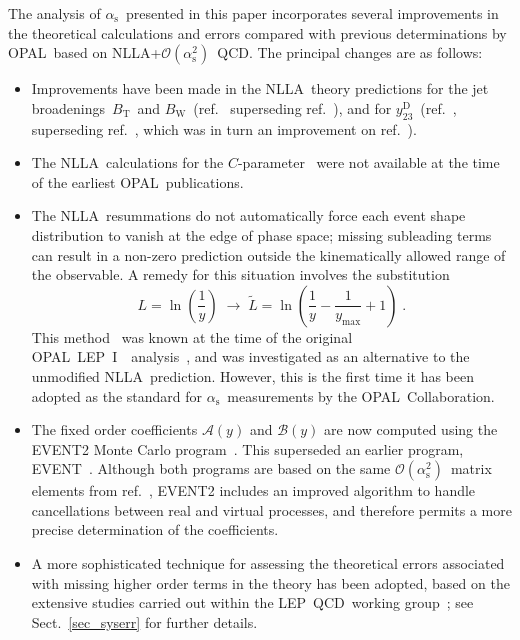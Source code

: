 \documentclass[12pt,a4paper,twoside]{article}
\newcommand{\as}     {\ensuremath{\alpha_{\mathrm{s}}}}
\newcommand{\oaa}    {\ensuremath{\mathcal{O}(\alpha_{\mathrm{s}}^2)}}
\newcommand{\bt}     {\ensuremath{B_{\mathrm{T}}}}
\newcommand{\bw}     {\ensuremath{B_{\mathrm{W}}}}
\newcommand{\ytwothree}   {\ensuremath{y^{\mathrm{D}}_{23}}}
\newcommand{\Opal}{\mbox{\rm OPAL}}
\newcommand{\Lep}{\mbox{LEP}}
\newcommand{\qcd}{\mbox{QCD}}
\newcommand{\nlla}{\mbox{NLLA}}
\newcommand{\Lepone}{\mbox{LEP I }}
\newcommand{\Event}{\mbox{EVENT}}
\begin{document}
The analysis of \as\ presented in this paper incorporates several 
improvements in the theoretical calculations and errors compared 
with previous determinations by \Opal\ based on 
\nlla+\oaa\ \qcd.  The principal changes are as follows:
\begin{itemize}
\item Improvements have been made in the \nlla\ theory predictions
for the jet broadenings~\bt\ and \bw~(ref.~\cite{nllabtbw2} 
superseding ref.~\cite{nllabjet}), 
and for \ytwothree~(ref.~\cite{nllay23}, superseding ref.~\cite{nllad2}, 
which 
was in turn an improvement on ref.~\cite{nlla-r2}). 
\item The \nlla\ calculations for the $C$-parameter~\cite{nllacp}
were not available at the time of the earliest \Opal\ publications.
\item The \nlla\ resummations do not automatically force each event
shape distribution to vanish at the edge of phase space; missing
subleading terms can result in a non-zero prediction outside the
kinematically allowed range of the
observable. A remedy
for this situation involves the substitution
\begin{equation}
L=\ln\left(\frac{1}{y}\right)\;\to\;\widetilde{L}=
\ln \left(\frac{1}{y}-\frac{1}{y_\mathrm{max}}+1\right)\;.
\label{modifiedlog}
\end{equation}
This method~\cite{nllathmh} was known at the time of the original
\Opal\ \Lepone\ analysis~\cite{OPALPR075}, and was investigated as an
alternative to the unmodified \nlla\ prediction. However, this is the
first time it has been
adopted as the standard for \as\ measurements by the \Opal\
Collaboration. 
\item The fixed order coefficients $\mathcal{A}(y)$ and $\mathcal{B}(y)$ 
are now computed using the \Event2 Monte Carlo program~\cite{event2}.
This superseded an earlier program, \Event~\cite{KN}.  
Although both programs are based on the same \oaa\ matrix elements
from ref.~\cite{ERT}, \Event2 includes an improved algorithm to
handle cancellations between real and virtual processes, and therefore
permits a more precise determination of the coefficients. 
\item A more sophisticated technique for assessing the 
theoretical errors associated with missing higher order terms 
in the theory has been adopted, based on the extensive studies 
carried out within the \Lep\ \qcd\ working group~\cite{LEPQCDWG1};
see Sect.~\ref{sec_syserr} for further details.
\end{itemize} 
\end{document}
